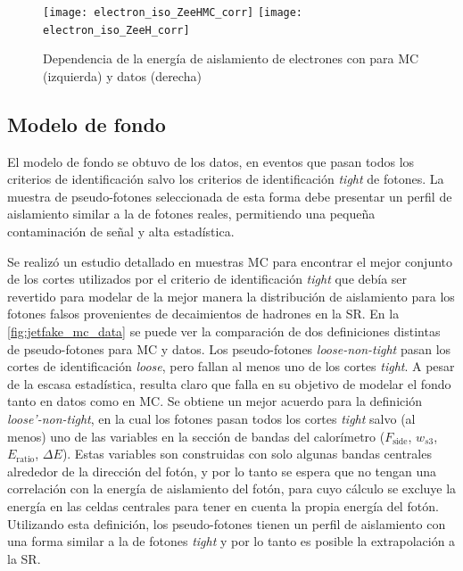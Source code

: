 \begin{figure}[!h]
  \centering

  \texttt{[image: electron\_iso\_ZeeHMC\_corr]}
  \texttt{[image: electron\_iso\_ZeeH\_corr]}

  \caption{Dependencia de la energía de aislamiento de electrones con {\HT}
    para MC (izquierda) y datos (derecha) \Zee}
    \label{fig:electron_iso_HT}

\end{figure}



\subsection{Modelo de fondo} \label{sec:jfake_bkg_template}

El modelo de fondo se obtuvo de los datos, en eventos que pasan todos los
criterios de identificación salvo los criterios de identificación \emph{tight}
de fotones. La muestra de pseudo-fotones seleccionada de esta forma debe
presentar un perfil de aislamiento similar a la de fotones reales, permitiendo
una pequeña contaminación de señal y alta estadística.

Se realizó un estudio detallado en muestras MC para encontrar el mejor conjunto
de los cortes utilizados por el criterio de identificación \emph{tight} que debía ser
revertido para modelar de la mejor manera la distribución de aislamiento para
los fotones falsos provenientes de decaimientos de hadrones en la SR. En la
\cref{fig:jetfake_mc_data} se puede ver la comparación de dos definiciones
distintas de pseudo-fotones para MC y datos.
Los pseudo-fotones \emph{loose-non-tight} pasan los cortes de
identificación \emph{loose}, pero fallan al menos uno de los cortes
\emph{tight}. A pesar de la escasa estadística, resulta claro que falla en su
objetivo de modelar el fondo tanto en datos como en MC. Se obtiene un mejor
acuerdo para la definición \emph{loose'-non-tight}, en la cual los
fotones pasan todos los cortes \emph{tight} salvo (al menos) uno de las
variables en la sección de bandas del calorímetro ($F_\text{side}$, $w_{s3}$, $E_\text{ratio}$,
$\Delta E$). Estas variables son construidas con solo algunas bandas centrales
alrededor de la dirección del fotón, y por lo tanto se espera que no tengan una
correlación con la energía de aislamiento del fotón, para cuyo cálculo se excluye
la energía en las celdas centrales para tener en cuenta la
propia energía del fotón. Utilizando esta definición, los pseudo-fotones tienen
un perfil de aislamiento con una forma similar a la de fotones \emph{tight} y
por lo tanto es posible la extrapolación a la SR.

